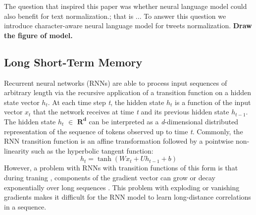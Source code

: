 \documentclass[letterpaper]{article}
\begin{document}
The question that inspired this paper was whether neural language model could also benefit for text normalization.; that is ... To answer this question we introduce character-aware neural language model for tweets normalization.  \textbf{Draw the figure of model.}

\subsection{Long Short-Term Memory}
Recurrent neural networks (RNNs) are able to process input sequences of arbitrary length via the recursive application of a transition function on a hidden state vector \textit{$h_{t}$}. At each time step \textit{t}, the hidden state \textit{$h_{t}$} is a function of the input vector \textit{$x_{t}$} that the network receives at time \textit{t} and its previous hidden state \textit{$h_{t-1}$}. The hidden state \textit{$h_{t}$} $\in$ $\mathbf{R^{d}}$ can be interpreted as a \textit{d}-dimensional distributed representation of the sequence of tokens observed up to time \textit{t}. Commonly, the RNN transition function is an affine transformation followed by a pointwise non-linearity such as the hyperbolic tangent function:
\begin{equation}\label{rnn}
h_{t} = \tanh(Wx_{t}+Uh_{t-1}+b)
\end{equation}
However, a problem with RNNs with transition functions of this form is that during traning , components of the gradient vector can grow or decay exponentially over long sequences \cite{Hochreiter:1998:VGP:353515.355233}. This problem with exploding or vanishing gradients makes it difficult for the RNN model to learn long-distance correlations in a sequence.
\end{document}
